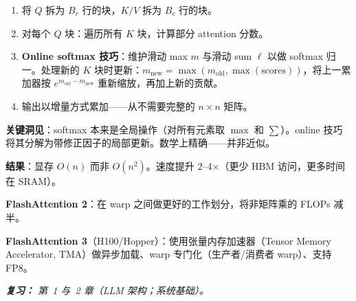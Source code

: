 \begin{questionbox}
\begin{enumerate}
  \item 将 $Q$ 拆为 $B_r$ 行的块，$K/V$ 拆为 $B_c$ 行的块。
  \item 对每个 $Q$ 块：遍历所有 $K$ 块，计算部分 attention 分数。
  \item \textbf{Online softmax 技巧}：维护滑动 max $m$ 与滑动 sum $\ell$ 以做 softmax 归一。处理新的 $K$ 块时更新：$m_\text{new} = \max(m_\text{old}, \max(\text{scores}))$，将上一累加器按 $e^{m_\text{old} - m_\text{new}}$ 重新缩放，再加上新的贡献。
  \item 输出以增量方式累加——从不需要完整的 $n \times n$ 矩阵。
\end{enumerate}

\textbf{关键洞见}：softmax 本来是全局操作（对所有元素取 $\max$ 和 $\sum$）。online 技巧将其分解为带修正因子的局部更新。数学上精确——并非近似。

\textbf{结果}：显存 $O(n)$ 而非 $O(n^2)$。速度提升 2--4$\times$（更少 HBM 访问，更多时间在 SRAM）。

\textbf{FlashAttention 2}：在 warp 之间做更好的工作划分，将非矩阵乘的 FLOPs 减半。

\textbf{FlashAttention 3}（H100/Hopper）：使用张量内存加速器（Tensor Memory Accelerator, TMA）做异步加载、warp 专门化（生产者/消费者 warp）、支持 FP8。

\emph{\textbf{复习：} 第~1 与~2 章（LLM 架构；系统基础）。}
\end{questionbox}

